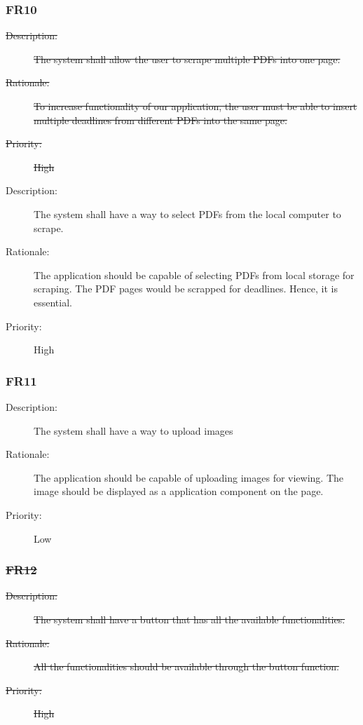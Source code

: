 \documentclass[12pt, titlepage]{article}
\begin{document}
\subsubsection{FR10}

\begin{description}
  \item[\sout{Description:}] \sout{The system shall allow the user to scrape multiple PDFs into one page.}
  \item[\sout{Rationale:}] \sout{To increase functionality of our application, the user must be able to insert multiple deadlines from different PDFs into the same page. }
  \item[\sout{Priority:}] \sout{High}
\end{description}

\begin{description}
  \item[Description:] The system shall have a way to select PDFs from the local computer to scrape.  
  \item[Rationale:] The application should be capable of selecting PDFs from local storage for scraping. The PDF pages would be scrapped for deadlines. Hence, it is essential.
  \item[Priority:] High
\end{description}

\subsubsection{FR11}

\begin{description}
  \item[Description:] The system shall have a way to upload images
  \item[Rationale:] The application should be capable of uploading images for viewing. The image should be displayed as a application component on the page.
  \item[Priority:] Low
\end{description}

\subsubsection{\sout{FR12}}

\begin{description}
  \item[\sout{Description:}] \sout{The system shall have a button that has all the available functionalities.}
  \item[\sout{Rationale:}] \sout{All the functionalities should be available through the button function.}
  \item[\sout{Priority:}] \sout{High}
\end{description}
\end{document}
